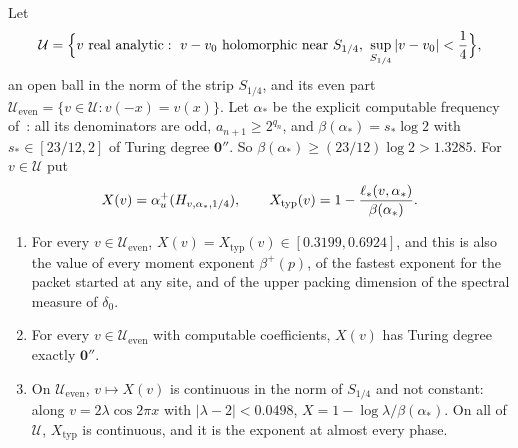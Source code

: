 Let
\[
\mathcal U=\Bigl\{v\text{ real analytic}:\ v-v_0\text{ holomorphic near }S_{1/4},\ \sup_{S_{1/4}}|v-v_0|<\frac14\Bigr\},
\]
an open ball in the norm of the strip $S_{1/4}$, and its even part $\mathcal U_{\mathrm{even}}=\{v\in\mathcal U:v(-x)=v(x)\}$. Let $\alpha_*$ be the explicit computable frequency of~\cite[Theorem~D(3)]{DMamo}: all its denominators are odd, $a_{n+1}\ge2^{q_n}$, and $\beta(\alpha_*)=s_*\log2$ with $s_*\in[23/12,2]$ of Turing degree $\mathbf 0''$. So $\beta(\alpha_*)\ge(23/12)\log2>1.3285$. For $v\in\mathcal U$ put
\[
X(v)=\alpha_u^+(H_{v,\alpha_*,1/4}),\qquad X_{\mathrm{typ}}(v)=1-\frac{\ell_*(v,\alpha_*)}{\beta(\alpha_*)} .
\]

\begin{theorem}\label{thm:robust}
\begin{enumerate}
\item For every $v\in\mathcal U_{\mathrm{even}}$, $X(v)=X_{\mathrm{typ}}(v)\in[0.3199,0.6924]$, and this is also the value of every moment exponent $\beta^+(p)$, of the fastest exponent for the packet started at any site, and of the upper packing dimension of the spectral measure of $\delta_0$.
\item For every $v\in\mathcal U_{\mathrm{even}}$ with computable coefficients, $X(v)$ has Turing degree exactly $\mathbf 0''$.
\item On $\mathcal U_{\mathrm{even}}$, $v\mapsto X(v)$ is continuous in the norm of $S_{1/4}$ and not constant: along $v=2\lambda\cos2\pi x$ with $|\lambda-2|<0.0498$, $X=1-\log\lambda/\beta(\alpha_*)$. On all of $\mathcal U$, $X_{\mathrm{typ}}$ is continuous, and it is the exponent at almost every phase.
\end{enumerate}
\end{theorem}

